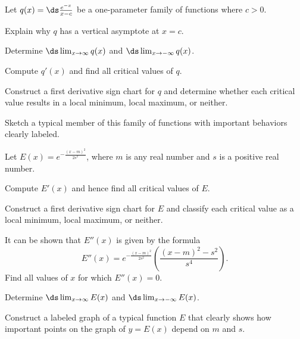 \begin{exercises}
\item Let $q(x) = \ds \frac{e^{-x}}{x-c}$ be a one-parameter family of functions where $c > 0$.
\ba
	\item Explain why $q$ has a vertical asymptote at $x = c$.
	\item Determine $\ds \lim_{x \to \infty} q(x)$ and $\ds \lim_{x \to -\infty} q(x)$.
	\item Compute $q'(x)$ and find all critical values of $q$.
	\item Construct a first derivative sign chart for $q$ and determine whether each critical value results in a local minimum, local maximum, or neither.
	\item Sketch a typical member of this family of functions with important behaviors clearly labeled.
\ea
\item Let $E(x) = e^{-\frac{(x-m)^2}{2s^2}}$, where $m$ is any real number and $s$ is a positive real number.
\ba
	\item Compute $E'(x)$ and hence find all critical values of $E$.
	\item Construct a first derivative sign chart for $E$ and classify each critical value as a local minimum, local maximum, or neither.
	\item It can be shown that $E''(x)$ is given by the formula
	$$E''(x) = e^{-\frac{(x-m)^2}{2s^2}} \left(\frac{(x-m)^2 - s^2}{s^4} \right).$$
	Find all values of $x$ for which $E''(x) = 0$.
	\item Determine $\ds \lim_{x \to \infty} E(x)$ and $\ds \lim_{x \to -\infty} E(x)$.
	\item Construct a labeled graph of a typical function $E$ that clearly shows how important points on the graph of $y = E(x)$ depend on $m$ and $s$.
\ea
\end{exercises}
\afterexercises